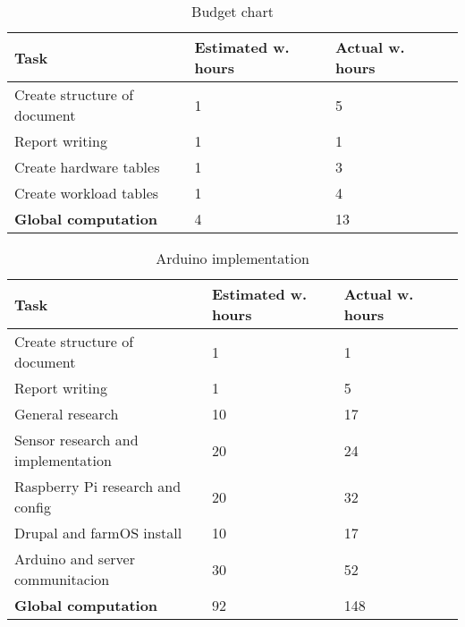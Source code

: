 \begin{table}[H]
\caption{Budget chart}
\begin{tabular}{llll}
\hline
                               \textbf{Task}    & \textbf{Estimated w. hours} & \textbf{Actual w. hours} \\ \hline
\rowcolor{lightgray}
Create structure of document                    & 1                           & 5                      \\
Report writing                                  & 1                           & 1                      \\
\rowcolor{lightgray}
Create hardware tables                          & 1                           & 3                     \\
Create workload tables                          & 1                           & 4                      \\
\rowcolor{lightgray}
\textbf{Global computation}                     & 4                          & 13                     \\
\end{tabular}
\end{table}

\begin{table}[H]
\caption{Arduino implementation}
\begin{tabular}{llll}
\hline
                               \textbf{Task}    & \textbf{Estimated w. hours} & \textbf{Actual w. hours} \\ \hline
\rowcolor{lightgray}
Create structure of document                    & 1                           & 1                      \\
Report writing                                  & 1                           & 5                      \\
\rowcolor{lightgray}
General research                                & 10                          & 17                     \\
Sensor research and implementation              & 20                          & 24                      \\
\rowcolor{lightgray}
Raspberry Pi research and config                & 20                          & 32                      \\
Drupal and farmOS install                       & 10                          & 17                      \\
\rowcolor{lightgray}
Arduino and server communitacion                & 30                          & 52                      \\
\textbf{Global computation}                     & 92                          & 148                     \\
\end{tabular}
\end{table}

